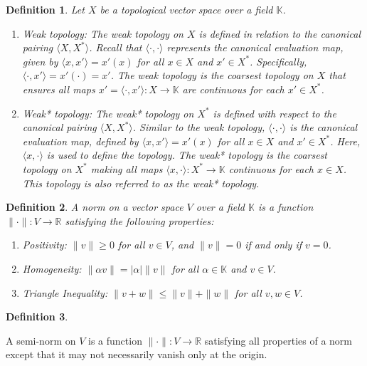 \documentclass{article}
\newtheorem{definition}{Definition}[subsection]
\theoremstyle{definition}
\begin{document}
\begin{definition} 
    Let $X$ be a topological vector space over a field $\mathbb{K}$.
    \begin{enumerate}
        
        \item \textit{Weak topology}: 
        The weak topology on \(X\) is defined in relation to the canonical pairing \(\langle X, X^* \rangle\). Recall that \(\langle \cdot , \cdot \rangle\) represents the canonical evaluation map, given by \(\langle x, x' \rangle = x'(x)\) for all \(x \in X\) and \(x' \in X^*\). Specifically, \(\langle \cdot , x' \rangle = x'(\cdot) = x'\). The weak topology is the coarsest topology on \(X\) that ensures all maps \(x' = \langle \cdot , x' \rangle: X \to \mathbb{K}\) are continuous for each \(x' \in X^*\).

        \item \textit{Weak* topology}: 
        The weak* topology on \(X^*\) is defined with respect to the canonical pairing \(\langle X, X^* \rangle\). Similar to the weak topology, \(\langle \cdot , \cdot \rangle\) is the canonical evaluation map, defined by \(\langle x, x' \rangle = x'(x)\) for all \(x \in X\) and \(x' \in X^*\). Here, \(\langle x, \cdot \rangle\) is used to define the topology. The weak* topology is the coarsest topology on \(X^*\) making all maps \(\langle x, \cdot \rangle: X^* \to \mathbb{K}\) continuous for each \(x \in X\). This topology is also referred to as the weak* topology.
    \end{enumerate}

\end{definition}




\begin{definition}
    A norm on a vector space $V$ over a field $\mathbb{K}$ is a function $\|\cdot\|: V \rightarrow \mathbb{R}$ satisfying the following properties:
\begin{enumerate}
    \item Positivity: $\|v\| \geq 0$ for all $v \in V$, and $\|v\| = 0$ if and only if $v = 0$.
    \item Homogeneity: $\|\alpha v\| = |\alpha|\|v\|$ for all $\alpha \in \mathbb{K}$ and $v \in V$.
    \item Triangle Inequality: $\|v + w\| \leq \|v\| + \|w\|$ for all $v, w \in V$.
\end{enumerate}
\end{definition}

\begin{definition}
    
\end{definition}
    A semi-norm on $V$ is a function $\|\cdot\|: V \rightarrow \mathbb{R}$ satisfying all properties of a norm except that it may not necessarily vanish only at the origin.
\end{document}
